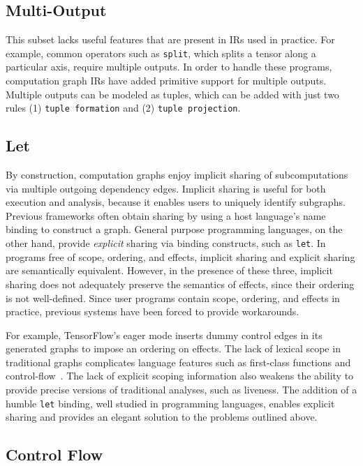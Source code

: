   \subsection{Multi-Output}

  This subset lacks useful features that are present in IRs used
    in practice.
  For example, common operators such as \verb|split|, which splits
    a tensor along a particular axis, require multiple outputs.
  In order to handle these programs,
    computation graph IRs have added primitive support
    for multiple outputs.
  Multiple outputs can be modeled as tuples, which can
    be added with just two rules (1) \verb|tuple formation|
    and (2) \verb|tuple projection|.

  \subsection{Let}

  By construction, computation graphs enjoy implicit sharing of subcomputations via multiple outgoing
  dependency edges.
  Implicit sharing is useful for both execution and analysis,
    because it enables users to uniquely identify subgraphs.
  Previous frameworks often obtain sharing by using a host
    language's name binding to construct a graph.
  General purpose programming languages, on the other hand, provide \textit{explicit}
    sharing via binding constructs, such as \verb|let|.
  In programs free of scope, ordering, and effects, implicit sharing
    and explicit sharing are semantically equivalent.
  However, in the presence of these three, implicit sharing does not adequately preserve the semantics
    of effects, since their ordering is not well-defined.
  Since user programs contain scope, ordering, and effects in practice,
    previous systems have been forced to provide workarounds.

  For example, TensorFlow's eager mode inserts dummy control edges
    in its generated graphs to impose an ordering on effects.
  The lack of lexical scope in traditional graphs complicates language features
    such as first-class functions and control-flow~\citep{funarg, funarg_sol}.
  The lack of explicit scoping information also weakens the ability
    to provide precise versions of traditional analyses, such as liveness.
  The addition of a humble \verb|let| binding, well studied in programming languages,
    enables explicit sharing and provides an elegant solution to the problems outlined above.

  \subsection{Control Flow}

